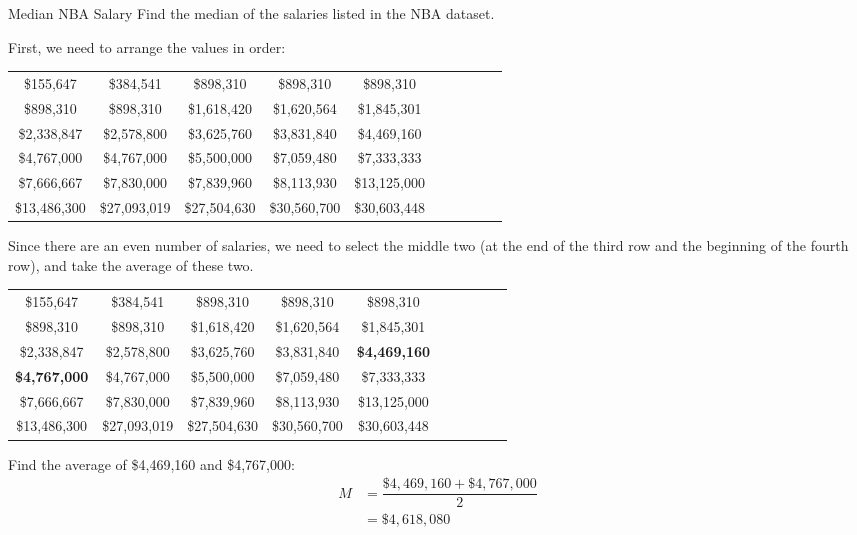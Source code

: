 \begin{example}{Median NBA Salary}
Find the median of the salaries listed in the NBA dataset.

\sol
First, we need to arrange the values in order:
\begin{center}
\begin{tabular}{c c c c c c c c c c}
\$155,647 & 
\$384,541 & 
\$898,310 & 
\$898,310 & 
\$898,310\\
\$898,310 & 
\$898,310 & 
\$1,618,420 & 
\$1,620,564 & 
\$1,845,301\\ 
\$2,338,847 & 
\$2,578,800 & 
\$3,625,760 & 
\$3,831,840 & 
\$4,469,160\\
\$4,767,000 & 
\$4,767,000 & 
\$5,500,000 & 
\$7,059,480 & 
\$7,333,333\\
\$7,666,667 & 
\$7,830,000 & 
\$7,839,960 & 
\$8,113,930 & 
\$13,125,000\\
\$13,486,300 & 
\$27,093,019 & 
\$27,504,630 & 
\$30,560,700 & 
\$30,603,448
\end{tabular}
\end{center}

Since there are an even number of salaries, we need to select the middle two (at the end of the third row and the beginning of the fourth row), and take the average of these two.
\begin{center}
\begin{tabular}{c c c c c c c c c c}
\$155,647 & 
\$384,541 & 
\$898,310 & 
\$898,310 & 
\$898,310\\
\$898,310 & 
\$898,310 & 
\$1,618,420 & 
\$1,620,564 & 
\$1,845,301\\ 
\$2,338,847 & 
\$2,578,800 & 
\$3,625,760 & 
\$3,831,840 & 
{\Large\bfseries\color{red} \$4,469,160}\\
{\Large\bfseries\color{red} \$4,767,000} & 
\$4,767,000 & 
\$5,500,000 & 
\$7,059,480 & 
\$7,333,333\\
\$7,666,667 & 
\$7,830,000 & 
\$7,839,960 & 
\$8,113,930 & 
\$13,125,000\\
\$13,486,300 & 
\$27,093,019 & 
\$27,504,630 & 
\$30,560,700 & 
\$30,603,448
\end{tabular}
\end{center}

Find the average of \$4,469,160 and \$4,767,000:
\begin{align*}
M &= \dfrac{\$4,469,160 + \$4,767,000}{2}\\
&= \boxed{\$4,618,080}
\end{align*}
\end{example}

